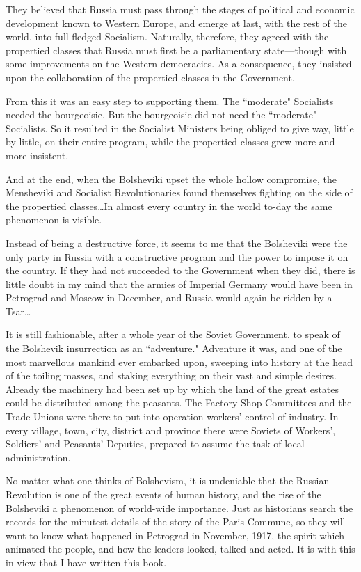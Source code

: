 They believed that Russia must pass through the stages of political and economic development known to Western Europe, and emerge at last, with the rest of the world, into full-fledged Socialism. Naturally, therefore, they agreed with the propertied classes that Russia must first be a parliamentary state—though with some improvements on the Western democracies. As a consequence, they insisted upon the collaboration of the propertied classes in the Government.

From this it was an easy step to supporting them. The ``moderate" Socialists needed the bourgeoisie. But the bourgeoisie did not need the ``moderate" Socialists. So it resulted in the Socialist Ministers being obliged to give way, little by little, on their entire program, while the propertied classes grew more and more insistent.

And at the end, when the Bolsheviki upset the whole hollow compromise, the Mensheviki and Socialist Revolutionaries found themselves fighting on the side of the propertied classes\ldots In almost every country in the world to-day the same phenomenon is visible.

Instead of being a destructive force, it seems to me that the Bolsheviki were the only party in Russia with a constructive program and the power to impose it on the country. If they had not succeeded to the Government when they did, there is little doubt in my mind that the armies of Imperial Germany would have been in Petrograd and Moscow in December, and Russia would again be ridden by a Tsar\ldots

It is still fashionable, after a whole year of the Soviet Government, to speak of the Bolshevik insurrection as an ``adventure." Adventure it was, and one of the most marvellous mankind ever embarked upon, sweeping into history at the head of the toiling masses, and staking everything on their vast and simple desires. Already the machinery had been set up by which the land of the great estates could be distributed among the peasants. The Factory-Shop Committees and the Trade Unions were there to put into operation workers’ control of industry. In every village, town, city, district and province there were Soviets of Workers’, Soldiers’ and Peasants’ Deputies, prepared to assume the task of local administration.

No matter what one thinks of Bolshevism, it is undeniable that the Russian Revolution is one of the great events of human history, and the rise of the Bolsheviki a phenomenon of world-wide importance. Just as historians search the records for the minutest details of the story of the Paris Commune, so they will want to know what happened in Petrograd in November, 1917, the spirit which animated the people, and how the leaders looked, talked and acted. It is with this in view that I have written this book.

